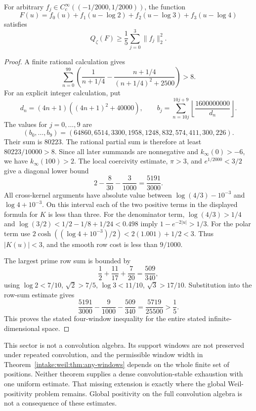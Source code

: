 \begin{theorem}\label{intake:weil:thm:four-windows}
For arbitrary $f_j\in C_c^\infty((-1/2000,1/2000))$, the function
\[
 F(u)=f_0(u)+f_1(u-\log2)+f_2(u-\log3)+f_3(u-\log4)
\]
satisfies
\[
 \boxed{\displaystyle Q_\zeta(F)\ge\frac15\sum_{j=0}^3\|f_j\|_2^2.}
\]
\end{theorem}
\begin{proof}
A finite rational calculation gives
\[
 \sum_{n=0}^{99}\left(\frac1{n+1/4}
 -\frac{n+1/4}{(n+1/4)^2+2500}\right)>8.
\]
For an explicit integer calculation, put
\[
 d_n=(4n+1)((4n+1)^2+40000),\qquad
 b_j=\sum_{n=10j}^{10j+9}\left\lfloor\frac{1600000000}{d_n}\right\rfloor.
\]
The values for $j=0,\ldots,9$ are
\[
 (b_0,\ldots,b_9)=(64860,6514,3300,1958,1248,832,574,411,300,226).
\]
Their sum is $80223$. The rational partial sum is therefore at least
$80223/10000>8$. Since all later summands are nonnegative and $k_\infty(0)>-6$, we have $k_\infty(100)>2$. The local coercivity estimate, $\pi>3$, and $e^{1/2000}<3/2$ give a diagonal lower bound
\[
 2-\frac8{30}-\frac3{1000}=\frac{5191}{3000}.
\]
All cross-kernel arguments have absolute value between $\log(4/3)-10^{-3}$ and $\log4+10^{-3}$. On this interval each of the two positive terms in the displayed formula for $K$ is less than three. For the denominator term, $\log(4/3)>1/4$ and $\log(3/2)<1/2-1/8+1/24<0.498$ imply $1-e^{-2|u|}>1/3$. For the polar term use $2\cosh((\log4+10^{-3})/2)<2(1.001)+1/2<3$. Thus $|K(u)|<3$, and the smooth row cost is less than $9/1000$.

The largest prime row sum is bounded by
\[
 \frac12+\frac{11}{17}+\frac7{20}=\frac{509}{340},
\]
using $\log2<7/10$, $\sqrt2>7/5$, $\log3<11/10$, $\sqrt3>17/10$. Substitution into the row-sum estimate gives
\[
 \frac{5191}{3000}-\frac9{1000}-\frac{509}{340}=\frac{5719}{25500}>\frac15.
\]
This proves the stated four-window inequality for the entire stated infinite-dimensional space.
\end{proof}

This sector is not a convolution algebra. Its support windows are not preserved under repeated convolution, and the permissible window width in Theorem~\ref{intake:weil:thm:any-windows} depends on the whole finite set of positions. Neither theorem supplies a dense convolution-stable exhaustion with one uniform estimate. That missing extension is exactly where the global Weil-positivity problem remains. Global positivity on the full convolution algebra is not a consequence of these estimates.


